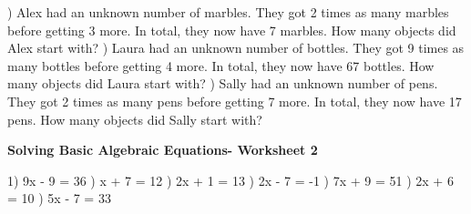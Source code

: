 \documentclass{article}%
\begin{document}
\newline%
\newline%
) Alex had an unknown number of marbles. They got 2 times as many marbles before getting 3 more. In total, they now have 7 marbles. How many objects did Alex start with?%
\newline%
\newline%
) Laura had an unknown number of bottles. They got 9 times as many bottles before getting 4 more. In total, they now have 67 bottles. How many objects did Laura start with?%
\newline%
\newline%
) Sally had an unknown number of pens. They got 2 times as many pens before getting 7 more. In total, they now have 17 pens. How many objects did Sally start with?%
\newline%
\newline%
\newline%
\pagebreak%
\large%
\begin{center}%
\textbf{Solving Basic Algebraic Equations- Worksheet 2}%
\newline%
\newline%
\newline%
\end{center} \normalsize%
1) 9x - 9 = 36%
\newline%
\newline%
) x + 7 = 12%
\newline%
\newline%
) 2x + 1 = 13%
\newline%
\newline%
) 2x - 7 = -1%
\newline%
\newline%
) 7x + 9 = 51%
\newline%
\newline%
) 2x + 6 = 10%
\newline%
\newline%
) 5x - 7 = 33%
\newline%
\newline%
\newline%
\end{document}
